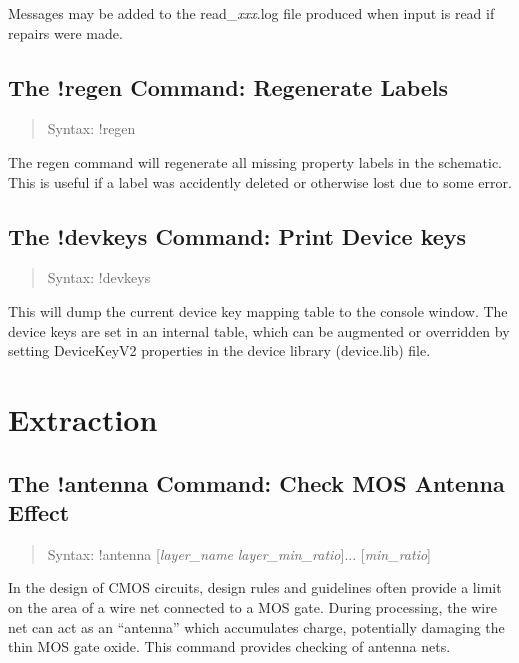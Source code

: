 Messages may be added to the {\vt read\_{\it xxx}.log} file produced
when input is read if repairs were made.

\subsection{The {\cb !regen} Command: Regenerate Labels}
\begin{quote}
Syntax: {\vt !regen}
\end{quote}
The {\cb regen} command will regenerate all missing property labels
in the schematic.  This is useful if a label was accidently deleted or
otherwise lost due to some error.

\subsection{The {\cb !devkeys} Command: Print Device keys}
\begin{quote}
Syntax: {\vt !devkeys}
\end{quote}
This will dump the current device key mapping table to the console
window.  The device keys are set in an internal table, which can be
augmented or overridden by setting {\et DeviceKeyV2} properties in the
device library ({\vt device.lib}) file.


\section{Extraction}

\subsection{The {\cb !antenna} Command: Check MOS Antenna Effect}
\begin{quote}
Syntax: {\vt !antenna} [{\it layer\_name} {\it layer\_min\_ratio\/}]...
[{\it min\_ratio\/}]
\end{quote}

In the design of CMOS circuits, design rules and guidelines often
provide a limit on the area of a wire net connected to a MOS gate. 
During processing, the wire net can act as an ``antenna'' which
accumulates charge, potentially damaging the thin MOS gate oxide. 
This command provides checking of antenna nets.

